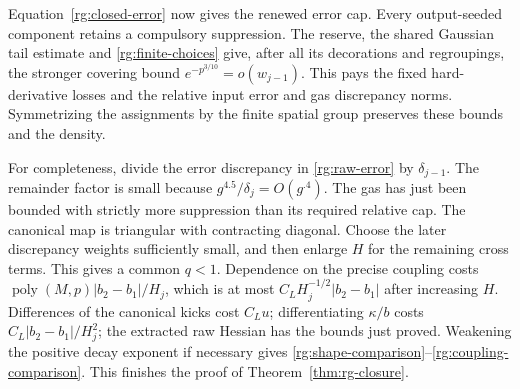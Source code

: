 Equation~\eqref{rg:closed-error} now gives the renewed error cap.
Every output-seeded component retains a compulsory suppression.
The reserve, the shared Gaussian tail estimate and
\eqref{rg:finite-choices} give, after all its decorations and
regroupings, the stronger covering bound
$e^{-p^{3/10}}=o(w_{j-1})$.  This pays the fixed hard-derivative
losses and the relative input error and gas discrepancy norms.
Symmetrizing the assignments by the finite spatial group
preserves these bounds and the density.

For completeness, divide the error discrepancy in
\eqref{rg:raw-error} by $\delta_{j-1}$.
The remainder factor is small because
$g^{4.5}/\delta_j=O(g^{.4})$.  The gas has just been bounded with
strictly more suppression than its required relative cap.
The canonical map is triangular with contracting diagonal.
Choose the later discrepancy weights sufficiently small, and
then enlarge $H$ for the remaining cross terms.  This gives a
common $q<1$.  Dependence on the precise coupling costs
$\operatorname{poly}(M,p)|b_2-b_1|/H_j$, which is at most
$C_LH_j^{-1/2}|b_2-b_1|$ after increasing $H$.
Differences of the canonical kicks cost $C_Lu$; differentiating
$\kappa/b$ costs $C_L|b_2-b_1|/H_j^2$; the extracted raw Hessian
has the bounds just proved.  Weakening the positive decay
exponent if necessary gives
\eqref{rg:shape-comparison}--\eqref{rg:coupling-comparison}.
This finishes the proof of Theorem~\ref{thm:rg-closure}.
